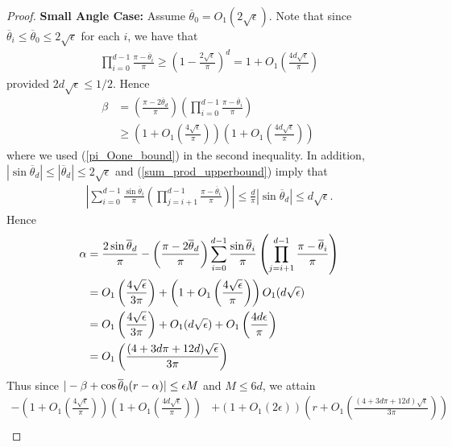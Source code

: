 \documentclass{article}
\begin{document}
\begin{proof}
\textbf{Small Angle Case:} Assume $\overline{\theta}_0 = O_1(2\sqrt{\epsilon})$. Note that since $\overline{\theta}_i \leq \overline{\theta}_0 \leq 2\sqrt{\epsilon}$ for each $i$, we have that \begin{align*}
\prod_{i=0}^{d-1} \frac{\pi - \overline{\theta}_i}{\pi} 
\geq \left(1 - \frac{2\sqrt{\epsilon}}{\pi} \right)^d = 1 + O_1 \left(\frac{4d\sqrt{\epsilon}}{\pi}\right)
\end{align*} provided $2d \sqrt{\epsilon} \leq 1/2$. Hence \begin{align*}
\beta  & = \left(\frac{\pi - 2\overline{\theta}_d}{\pi}\right) \left(\prod_{i=0}^{d-1} \frac{\pi - \overline{\theta}_i}{\pi}\right) \\
& \geq \left(1 + O_1\left(\frac{4\sqrt{\epsilon}}{\pi}\right)\right)\left(1 + O_1\left(\frac{4d\sqrt{\epsilon}}{\pi}\right)\right)\
\end{align*} where we used (\ref{pi_Oone_bound}) in the second inequality. In addition, $|\sin \overline{\theta}_d| \leq |\overline{\theta}_d| \leq 2\sqrt{\epsilon}$ and (\ref{sum_prod_upperbound}) imply that \begin{align*}
\left|\sum_{i=0}^{d-1} \frac{\sin \overline{\theta}_i}{\pi}\left(\prod_{j=i+1}^{d-1} \frac{\pi - \overline{\theta}_i}{\pi}\right)\right| \leq \frac{d}{\pi}|\sin \overline{\theta}_d| \leq d\sqrt{\epsilon}. 
\end{align*} Hence \begin{align*}
\alpha & = \frac{2\sin \overline{\theta}_d}{\pi} - \left(\frac{\pi - 2\overline{\theta}_d}{\pi}\right) \sum_{i=0}^{d-1} \frac{\sin \overline{\theta}_i}{\pi}\left(\prod_{j=i+1}^{d-1} \frac{\pi - \overline{\theta}_i}{\pi}\right) \\
& = O_1\left(\frac{4\sqrt{\epsilon}}{3\pi}\right) + \left(1 + O_1\left(\frac{4\sqrt{\epsilon}}{\pi}\right)\right)O_1(d\sqrt{\epsilon}) \\
& = O_1\left(\frac{4\sqrt{\epsilon}}{3\pi}\right) + O_1(d\sqrt{\epsilon}) + O_1\left(\frac{4d\epsilon}{\pi}\right) \\
& = O_1 \left(\frac{(4 + 3d\pi + 12d)\sqrt{\epsilon}}{3\pi}\right)
\end{align*} Thus since $|-\beta + \cos \overline{\theta}_0(r - \alpha)| \leq \epsilon M$ and $M \leq 6d$, we attain \begin{align*}
- \left(1 + O_1\left(\frac{4\sqrt{\epsilon}}{\pi}\right)\right)\left(1 + O_1\left(\frac{4d\sqrt{\epsilon}}{\pi}\right)\right) & + (1 + O_1(2\epsilon))\left(r + O_1 \left(\frac{(4 + 3d\pi + 12d)\sqrt{\epsilon}}{3\pi}\right)\right) \\

\end{align*}
\end{proof}
\end{document}
